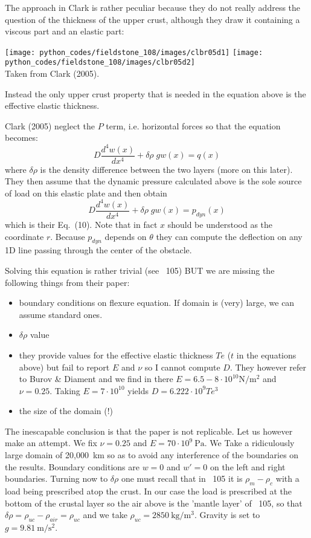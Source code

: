 The approach in Clark \etal is rather peculiar because they do not really address the question of the thickness
of the upper crust, although they draw it containing a viscous part and an elastic part:
\begin{center}
\texttt{[image: python\_codes/fieldstone\_108/images/clbr05d1]}
\texttt{[image: python\_codes/fieldstone\_108/images/clbr05d2]}\\
{\captionfont  Taken from Clark \etal (2005). }
\end{center}
Instead the only upper crust property that is needed in the equation above is the effective elastic thickness. 



Clark \etal (2005) neglect the $P$ term, i.e. horizontal forces so that the equation becomes:
\[
D \frac{d^4w(x)}{dx^4} + \delta\!\rho \; g w(x) = q(x)
\]
where $\delta\rho$ is the density difference between the two layers (more on this later). 
They then assume that the dynamic pressure calculated above is the sole source of load on this elastic plate and then obtain 
\[
D \frac{d^4w(x)}{dx^4} + \delta\!\rho \; g w(x) = p_{dyn}(x)
\]
which is their Eq.~(10). Note that in fact $x$ should be understood as the coordinate $r$. Because $p_{dyn}$ depends on $\theta$ they can compute the deflection on any 1D line passing through the center of the obstacle. 

Solving this equation is rather trivial (see \stone~105) BUT we are missing the following things from their paper:
\begin{itemize}
\item boundary conditions on flexure equation. If domain is (very) large, we can assume standard ones. 
\item $\delta \rho$ value
\item they provide values for the effective elastic thickness $T\!e$ ($t$ in the equations above) but fail to report $E$ and $\nu$ so I cannot compute $D$. They however refer to Burov \& Diament \cite{budi95} and we find in there $E=6.5-8\cdot 10^{10}\si{\newton\per\square\meter}$ and $\nu=0.25$.
Taking $E=7\cdot 10^{10}$ yields $D = 6.222\cdot 10^9 T\!e^3$ 
\item the size of the domain (!)
\end{itemize}
The inescapable conclusion is that the paper is not replicable. Let us however make an attempt. 
We fix $\nu=0.25$ and $E=70\cdot10^{9}~\si{\pascal}$. We Take a ridiculously large domain
of 20,000~\si{\km} so as to avoid any interference of the boundaries on the results. 
Boundary conditions are $w=0$ and $w'=0$ on the left and right boundaries. 
Turning now to $\delta \rho$ one must recall that in \stone~105 it is $\rho_m-\rho_c$ with a load being prescribed atop the crust.
In our case the load is prescribed at the bottom of the crustal layer so the air above is the 'mantle layer' of \stone~105, so that 
$\delta\rho=\rho_{uc}-\rho_{air}=\rho_{uc}$ and we take $\rho_{uc}=2850~\si{\kg\per\cubic\meter}$. 
Gravity is set to $g=9.81~\si{\metre\per\square\second}$.

